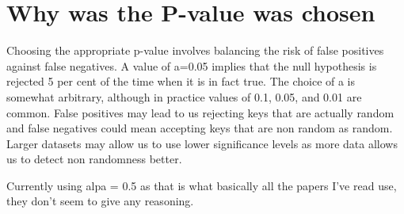 \section{Why was the P-value was chosen}
\label{sec:Pvalue}

Choosing the appropriate p-value involves balancing the risk of false positives against false negatives.  A value of a=0.05 implies that the null hypothesis is rejected 5 per cent of the time when it is in fact true. The choice of a is somewhat arbitrary, although in practice values of 0.1, 0.05, and 0.01 are common. False positives may lead to us rejecting keys that are actually random and false negatives could mean accepting keys that are non random as random. Larger datasets may allow us to use lower significance levels as more data allows us to detect non randomness better. \par
Currently using alpa = 0.5 as that is what basically all the papers I've read use, they don't seem to give any reasoning.
